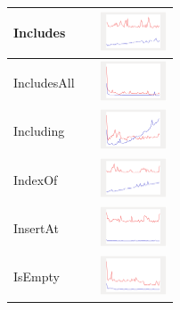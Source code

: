 \begin{longtable}{ m{2.5cm} m{8cm} m{2cm} }
Includes &

&
\includegraphics[width=2cm]{graphs/orderedset/small/Includes}
\\\hline

IncludesAll &

&
\includegraphics[width=2cm]{graphs/orderedset/small/IncludesAll}
\\\hline

Including &

&
\includegraphics[width=2cm]{graphs/orderedset/small/Including}
\\\hline

IndexOf &

&
\includegraphics[width=2cm]{graphs/orderedset/small/IndexOf}
\\\hline

InsertAt &

&
\includegraphics[width=2cm]{graphs/orderedset/small/InsertAt}
\\\hline

IsEmpty &

&
\includegraphics[width=2cm]{graphs/orderedset/small/IsEmpty}
\\\hline


\end{longtable}
